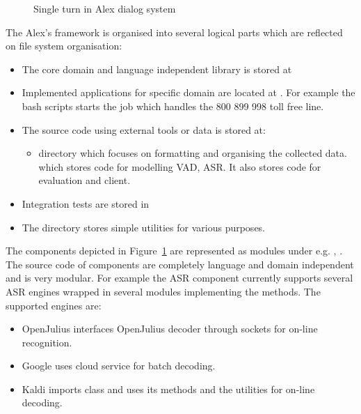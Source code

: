 \begin{figure}
    \begin{center}
    
    \caption{Single turn in Alex dialog system}
    \label{fig:dialog_system} 
    \end{center}
\end{figure}

The Alex's framework is organised into several logical parts which are reflected on file system organisation:
\begin{itemize}
    \item The core domain and language independent library is stored at 
    \item Implemented applications for specific domain are located at .
        For example the bash scripts  starts the job which handles the 800 899 998 toll free line.
    \item The source code using external tools or data is stored at:
        \begin{itemize}
            \item {} directory which focuses on formatting and organising the collected data.
            \term {} which stores code for modelling \ac{VAD}, \ac{ASR}. It also stores code for evaluation and  client.
        \end{itemize}
    \item Integration tests are stored in 
    \item The  directory stores simple utilities for various purposes.
\end{itemize}

The components depicted in Figure~\ref{fig:dialog_system} are represented as 
modules under  e.g. ,  .
The source code of components are completely language and domain independent and is very modular.
For example the \ac{ASR} component currently supports several \ac{ASR} engines wrapped in several modules
implementing the  methods. 
The supported engines are:
\begin{itemize}
    \item OpenJulius  interfaces OpenJulius decoder through sockets for on-line recognition.
    \item Google  uses cloud service for batch decoding.
    \item Kaldi  imports  class and uses its methods and the utilities for on-line decoding.
\end{itemize}

